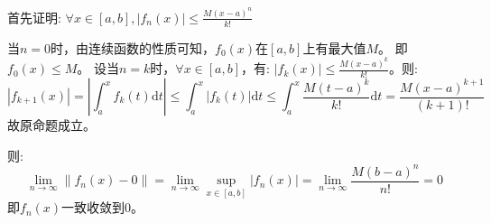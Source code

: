 \begin{solution}
    首先证明: \(\forall x \in [a,b], \left\vert f_{n}(x) \right\vert \le
    \frac{M(x-a)^{n}}{k!} \)

    当\(n=0\)时，由连续函数的性质可知，\(f_{0}(x)\)在\([a,b]\)上有最大值\(M\)。
    即\(f_{0}(x)\le M\)。
    设当\(n=k\)时，\(\forall x \in [a,b]\)，有: \(\left\vert f_{k}(x)
        \right\vert \le
    \frac{M(x-a)^{k}}{k!}\)。则:
    \[
        \left\vert f_{k+1}(x) \right\vert
        = \left\vert \int_{a}^{x} f_{k}(t) \mathrm{d}t \right\vert
        \le \int_{a}^{x} \left\vert f_{k}(t) \right\vert \mathrm{d}t
        \le \int_{a}^{x} \frac{M(t-a)^{k}}{k!} \mathrm{d}t =
        \frac{M(x-a)^{k+1}}{(k+1)!}
    \]
    故原命题成立。

    则:
    \[
        \lim_{n \to \infty} \left\lVert f_{n}(x) - 0 \right\rVert
        =\lim_{n \to \infty} \sup_{x \in [a,b]} \left\vert f_{n}(x)
        \right\vert = \lim_{n \to \infty} \frac{M(b-a)^{n}}{n!} = 0
    \]
    即\(f_{n}(x)\)一致收敛到\(0\)。
\end{solution}
